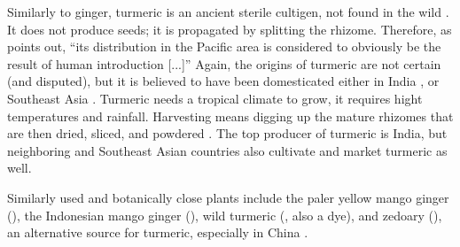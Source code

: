 Similarly to ginger, turmeric is an ancient sterile \gls{cultigen}, not found in the wild \autocite[128]{van_wyk_culinary_2014}. It does not produce seeds; it is propagated by splitting the rhizome. Therefore, as \textcite{kikusawa_proto_2007} points out, ``its distribution in the Pacific area is considered to obviously be the result of human introduction [...]'' Again, the origins of turmeric are not certain (and disputed), but it is believed to have been domesticated either in India \autocite{van_wyk_culinary_2014,powo,nair_turmeric_2019}, or Southeast Asia \autocite{mabberley_mabberleys_2017,kikusawa_proto_2007}. Turmeric needs a tropical climate to grow, it requires hight temperatures and rainfall. Harvesting means digging up the mature rhizomes that are then dried, sliced, and powdered \autocite[128]{van_wyk_culinary_2014}. The top producer of turmeric is India, but neighboring and Southeast Asian countries also cultivate and market turmeric as well.

Similarly used and botanically close plants include the paler yellow mango ginger (), the Indonesian mango ginger (), wild turmeric (, also a dye), and zedoary (), an alternative source for turmeric, especially in China \autocite[128]{van_wyk_culinary_2014}.





